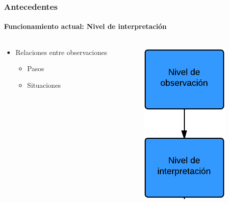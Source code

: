 \begin{frame}
	\frametitle{Antecedentes}
	\framesubtitle{Funcionamiento actual: Nivel de interpretaci\'on}
	
	\begin{columns}[T] %
		\begin{column}[T]{5cm} %
			\begin{itemize}
				\item Relaciones entre observaciones
				\begin{itemize}
					\item Pasos
					\item Situaciones
				\end{itemize}
			\end{itemize}
		\end{column}
		\begin{column}[T]{5cm} %
			\includegraphics[width=0.5\linewidth]{./Figures/NivelDeInterpretacion.png}
		\end{column}
	\end{columns}
\end{frame}


